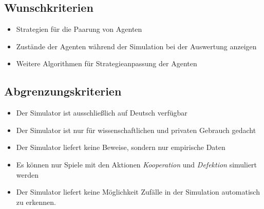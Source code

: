 \subsection{Wunschkriterien}
\begin{itemize}
\item Strategien für die Paarung von Agenten
\item Zustände der Agenten während der Simulation bei der Auswertung anzeigen
\item Weitere Algorithmen für Strategieanpassung der Agenten
\end{itemize}

\subsection{Abgrenzungskriterien}
\begin{itemize}
\item Der Simulator ist ausschließlich auf Deutsch verfügbar
\item Der Simulator ist nur für wissenschaftlichen {\color{red}und privaten} Gebrauch gedacht
\item Der Simulator liefert keine Beweise, sondern nur empirische Daten
\item Es können nur Spiele mit den Aktionen \emph{Kooperation} und \emph{Defektion} simuliert werden
\item Der Simulator liefert keine Möglichkeit Zufälle in der Simulation automatisch zu erkennen.
\end{itemize}
